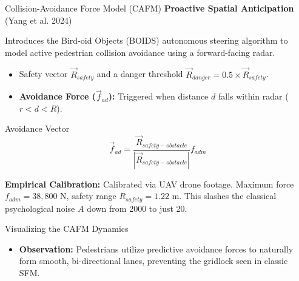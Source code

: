 \documentclass[aspectratio=169]{beamer}
\begin{document}
\begin{frame}{Collision-Avoidance Force Model (CAFM)}
    \textbf{Proactive Spatial Anticipation} (Yang et al. 2024)
    \vspace{0.2cm}

    Introduces the Bird-oid Objects (BOIDS) autonomous steering algorithm to model active pedestrian collision avoidance using a forward-facing radar.
    
    \begin{itemize}
        \item Safety vector $\vec{R}_{safety}$ and a danger threshold $\vec{R}_{danger} = 0.5 \times \vec{R}_{safety}$.
        \item \textbf{Avoidance Force ($\vec{f}_{ad}$):} Triggered when distance $d$ falls within radar ($r < d < R$).
    \end{itemize}

    \begin{block}{Avoidance Vector}
    \[
    \vec{f}_{ad}=\frac{\vec{R}_{safety-obstacle}}{|\vec{R}_{safety-obstacle}|}f_{adm}
    \]
    \end{block}

    \textbf{Empirical Calibration:} Calibrated via UAV drone footage. Maximum force $f_{adm} = 38,800$ N, safety range $R_{safety} = 1.22$ m. This slashes the classical psychological noise $A$ down from 2000 to just 20.
\end{frame}

\begin{frame}{Visualizing the CAFM Dynamics}
    \begin{center}
    \end{center}
    
    \vspace{0.2cm}
    \begin{itemize}
        \item \textbf{Observation:} Pedestrians utilize predictive avoidance forces to naturally form smooth, bi-directional lanes, preventing the gridlock seen in classic SFM.
    \end{itemize}
\end{frame}
\end{document}
